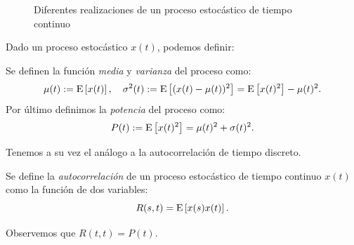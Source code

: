 \begin{figure}
    \begin{center}
        \caption{Diferentes realizaciones de un proceso estocástico de tiempo continuo}\label{fig:realizaciones}
    \end{center}
\end{figure}

Dado un proceso estocástico $x(t)$, podemos definir:
\begin{definicion}\label{def:media_var_tc}
    Se definen la función \emph{media} y \emph{varianza} del proceso como:
    \begin{equation*}
        \mu(t) := \mathrm{E}\left[x(t)\right], \quad \sigma^2(t) := \mathrm{E}\left[(x(t)-\mu(t))^2\right] = \mathrm{E}\left[x(t)^2\right] - \mu(t)^2.
    \end{equation*}
    Por último definimos la \emph{potencia} del proceso como:
    \begin{equation*}
        P(t) := \mathrm{E}\left[x(t)^2\right] = \mu(t)^2 + \sigma(t)^2.
    \end{equation*}
\end{definicion}

Tenemos a su vez el análogo a la autocorrelación de tiempo discreto.
\begin{definicion}\label{def:autocorrelacion_noest_tc}
    Se define la \emph{autocorrelación} de un proceso estocástico de tiempo continuo $x(t)$ como la función de dos variables:
    \begin{equation*}
        R(s,t) = \mathrm{E}\left[x(s)x(t)\right].
    \end{equation*}
\end{definicion}
Observemos  que $R(t,t)=P(t)$.

